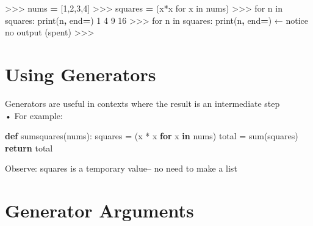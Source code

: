 \documentclass[
  letterpaper,
  DIV=11,
  numbers=noendperiod]{scrreprt}
\newenvironment{Shaded}{\begin{snugshade}}{\end{snugshade}}
\newcommand{\BuiltInTok}[1]{\textcolor[rgb]{0.00,0.23,0.31}{#1}}
\newcommand{\ControlFlowTok}[1]{\textcolor[rgb]{0.00,0.23,0.31}{\textbf{#1}}}
\newcommand{\DecValTok}[1]{\textcolor[rgb]{0.68,0.00,0.00}{#1}}
\newcommand{\ErrorTok}[1]{\textcolor[rgb]{0.68,0.00,0.00}{#1}}
\newcommand{\FunctionTok}[1]{\textcolor[rgb]{0.28,0.35,0.67}{#1}}
\newcommand{\KeywordTok}[1]{\textcolor[rgb]{0.00,0.23,0.31}{\textbf{#1}}}
\newcommand{\NormalTok}[1]{\textcolor[rgb]{0.00,0.23,0.31}{#1}}
\newcommand{\OperatorTok}[1]{\textcolor[rgb]{0.37,0.37,0.37}{#1}}
\newcommand{\StringTok}[1]{\textcolor[rgb]{0.13,0.47,0.30}{#1}}
\begin{document}
\begin{Shaded}
\begin{Highlighting}[]
\NormalTok{\textgreater{}\textgreater{}\textgreater{} nums }\KeywordTok{=}\NormalTok{ [}\DecValTok{1}\NormalTok{,}\DecValTok{2}\NormalTok{,}\DecValTok{3}\NormalTok{,}\DecValTok{4}\NormalTok{]  }
\NormalTok{\textgreater{}\textgreater{}\textgreater{} squares }\KeywordTok{=}\NormalTok{ (x}\FunctionTok{*}\NormalTok{x for x in nums)  }
\NormalTok{\textgreater{}\textgreater{}\textgreater{} for n in squares}\FunctionTok{:}  
\NormalTok{    print(n}\KeywordTok{,}\NormalTok{ end}\KeywordTok{=}\StringTok{\textquotesingle{}\textquotesingle{}}\NormalTok{)  }
\DecValTok{1} \DecValTok{4} \DecValTok{9} \DecValTok{16}  
\NormalTok{\textgreater{}\textgreater{}\textgreater{} for n in squares}\FunctionTok{:}  
\NormalTok{    print(n}\KeywordTok{,}\NormalTok{ end}\KeywordTok{=}\StringTok{\textquotesingle{}\textquotesingle{}}\NormalTok{)  }
\ErrorTok{←}\NormalTok{ notice no output (spent)  }
\NormalTok{\textgreater{}\textgreater{}\textgreater{} }
\end{Highlighting}
\end{Shaded}


\chapter{Using Generators}\label{using-generators}

Generators are useful in contexts where the result is an intermediate
step\\
• For example:

\begin{Shaded}
\begin{Highlighting}[]
\KeywordTok{def}\NormalTok{ sumsquares(nums):}
\NormalTok{    squares }\OperatorTok{=}\NormalTok{ (x }\OperatorTok{*}\NormalTok{ x }\ControlFlowTok{for}\NormalTok{ x }\KeywordTok{in}\NormalTok{ nums)}
\NormalTok{    total }\OperatorTok{=} \BuiltInTok{sum}\NormalTok{(squares)}
    \ControlFlowTok{return}\NormalTok{ total }
\end{Highlighting}
\end{Shaded}

Observe: squares is a temporary value-- no need to make a list


\chapter{Generator Arguments}\label{generator-arguments}
\end{document}
